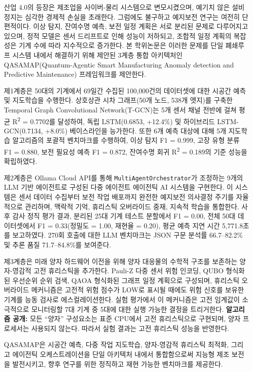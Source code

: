 산업 4.0의 등장은 제조업을 사이버-물리 시스템으로 변모시켰으며, 예기치 않은 설비 정지는 심각한 경제적 손실을 초래한다. 그럼에도 불구하고 예지보전 연구는 여전히 단편적이다. 이상 탐지, 잔여수명 예측, 보전 일정 계획은 서로 분리된 문제로 다루어지고 있으며, 정적 모델은 센서 드리프트로 인해 성능이 저하되고, 조합적 일정 계획의 복잡성은 기계 수에 따라 지수적으로 증가한다. 본 학위논문은 이러한 문제를 단일 폐쇄루프 시스템 내에서 해결하기 위해 제안된 3계층 통합 아키텍처인 QASAMAP(Quantum-Agentic Smart Manufacturing Anomaly detection and Predictive Maintenance) 프레임워크를 제안한다.

제1계층은 50대의 기계에서 69일간 수집된 100,000건의 데이터셋에 대한 시공간 예측 및 지도학습을 수행한다. 상호상관 시차 그래프(50개 노드, 538개 엣지)를 구축한 Temporal Graph Convolutional Network(T-GCN)는 5개 센서 채널 전반에 걸쳐 평균 R\textsuperscript{2} = 0.7702를 달성하여, 독립 LSTM(0.6853, +12.4\%) 및 하이브리드 LSTM-GCN(0.7134, +8.0\%) 베이스라인을 능가한다. 또한 6개 예측 대상에 대해 5개 지도학습 알고리즘의 포괄적 벤치마크를 수행하여, 이상 탐지 F1 = 0.999, 고장 유형 분류 F1 = 0.880, 보전 필요성 예측 F1 = 0.872, 잔여수명 회귀 R\textsuperscript{2} = 0.189의 기준 성능을 확립하였다.

제2계층은 Ollama Cloud API를 통해 \texttt{MultiAgentOrchestrator}가 조정하는 9개의 LLM 기반 에이전트로 구성된 다중 에이전트 에이전틱 AI 시스템을 구현한다. 이 시스템은 센서 데이터 수집부터 보전 작업 배포까지 완전한 예지보전 의사결정 주기를 자율적으로 관리하며, 맥락적 기억, 휴리스틱 오버라이드 중재, 지속적 학습을 통합한다. 사후 감사 정직 평가 결과, 분리된 25대 기계 테스트 분할에서 F1 = 0.00, 전체 50대 데이터셋에서 F1 = 0.33(정밀도 = 1.00, 재현율 = 0.20), 평균 예측 지연 시간 5,771.8초를 보고하였다. 270회 호출에 대한 LLM 벤치마크는 JSON 구문 분석률 66.7--82.2\% 및 추론 품질 71.7--84.8\%를 보여준다.

제3계층은 미래 양자 하드웨어 이전을 위해 양자 대응물의 수학적 구조를 보존하는 양자-영감적 고전 휴리스틱을 추가한다. Pauli-Z 다중 센서 위험 인코딩, QUBO 형식화된 우선순위 순위 검색, QAOA 형식화된 그래프 일정 계획으로 구성되며, 휴리스틱 오버라이드 메커니즘은 고전적 위험 점수가 LOW로 표시될 때에도 위험 신호를 보유한 기계를 능동 검사로 에스컬레이션한다. 실험 평가에서 이 메커니즘은 고전 임계값이 소극적으로 모니터링할 7대 기계 중 5대에 대한 실행 가능한 결정을 트리거한다. \textbf{알고리즘 공개:} 모든 ``양자'' 구성요소는 표준 CPU에서 고전 휴리스틱으로 구현되며, 양자 프로세서는 사용되지 않는다. 따라서 실험 결과는 고전 휴리스틱 성능을 반영한다.

QASAMAP은 시공간 예측, 다중 작업 지도학습, 양자-영감적 휴리스틱 최적화, 그리고 에이전틱 오케스트레이션을 단일 아키텍처 내에서 통합함으로써 지능형 제조 보전을 발전시키고, 향후 연구를 위한 정직하고 재현 가능한 벤치마크를 제공한다.
